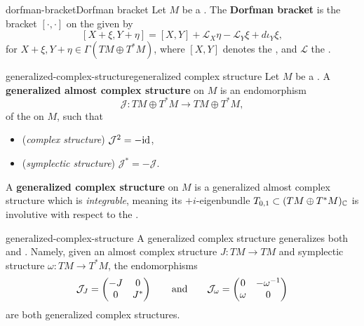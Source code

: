 \begin{topic}{dorfman-bracket}{Dorfman bracket}
    Let $M$ be a . The \textbf{Dorfman bracket} is the bracket $[\cdot, \cdot]$ on the  given by
    \[ [X + \xi, Y + \eta] = [X, Y] + \mathcal{L}_X \eta - \mathcal{L}_Y \xi + d \iota_Y \xi , \]
    for $X + \xi, Y + \eta \in \Gamma(TM \oplus T^*M)$, where $[X, Y]$ denotes the , and $\mathcal{L}$ the .
\end{topic}

\begin{topic}{generalized-complex-structure}{generalized complex structure}
    Let $M$ be a . A \textbf{generalized almost complex structure} on $M$ is an endomorphism
    \[ \mathcal{J} : TM \oplus T^*M \to TM \oplus T^*M , \]
    of the  on $M$, such that
    \begin{itemize}
        \item (\textit{complex structure}) $\mathcal{J}^2 = -\textup{id}$,
        \item (\textit{symplectic structure}) $\mathcal{J}^* = -\mathcal{J}$.
    \end{itemize}
    A \textbf{generalized complex structure} on $M$ is a generalized almost complex structure which is \textit{integrable}, meaning its $+i$-eigenbundle $T_{0, 1} \subset (TM \oplus T^*M)_{\mathbb{C}}$ is involutive with respect to the .
\end{topic}

\begin{example}{generalized-complex-structure}
    A generalized complex structure generalizes both  and . Namely, given an almost complex structure $J : TM \to TM$ and symplectic structure $\omega : TM \to T^*M$, the endomorphisms
    \[ \mathcal{J}_J = \begin{pmatrix} -J & 0 \\ 0 & J^* \end{pmatrix} \qquad \textup{and} \qquad \mathcal{J}_\omega = \begin{pmatrix} 0 & -\omega^{-1} \\ \omega & 0 \end{pmatrix} \]
    are both generalized complex structures.
\end{example}

